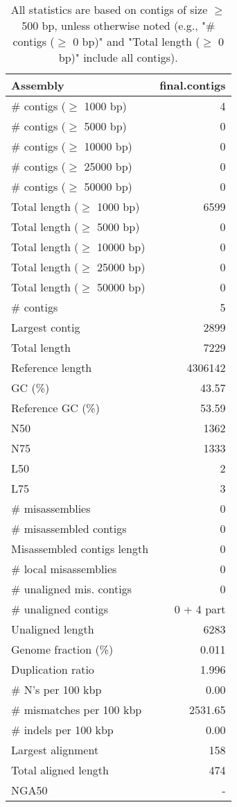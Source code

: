 \documentclass[12pt,a4paper]{article}
\begin{document}
\begin{table}[ht]
\begin{center}
\caption{All statistics are based on contigs of size $\geq$ 500 bp, unless otherwise noted (e.g., "\# contigs ($\geq$ 0 bp)" and "Total length ($\geq$ 0 bp)" include all contigs).}
\begin{tabular}{|l*{1}{|r}|}
\hline
Assembly & final.contigs \\ \hline
\# contigs ($\geq$ 1000 bp) & 4 \\ \hline
\# contigs ($\geq$ 5000 bp) & 0 \\ \hline
\# contigs ($\geq$ 10000 bp) & 0 \\ \hline
\# contigs ($\geq$ 25000 bp) & 0 \\ \hline
\# contigs ($\geq$ 50000 bp) & 0 \\ \hline
Total length ($\geq$ 1000 bp) & 6599 \\ \hline
Total length ($\geq$ 5000 bp) & 0 \\ \hline
Total length ($\geq$ 10000 bp) & 0 \\ \hline
Total length ($\geq$ 25000 bp) & 0 \\ \hline
Total length ($\geq$ 50000 bp) & 0 \\ \hline
\# contigs & 5 \\ \hline
Largest contig & 2899 \\ \hline
Total length & 7229 \\ \hline
Reference length & 4306142 \\ \hline
GC (\%) & 43.57 \\ \hline
Reference GC (\%) & 53.59 \\ \hline
N50 & 1362 \\ \hline
N75 & 1333 \\ \hline
L50 & 2 \\ \hline
L75 & 3 \\ \hline
\# misassemblies & 0 \\ \hline
\# misassembled contigs & 0 \\ \hline
Misassembled contigs length & 0 \\ \hline
\# local misassemblies & 0 \\ \hline
\# unaligned mis. contigs & 0 \\ \hline
\# unaligned contigs & 0 + 4 part \\ \hline
Unaligned length & 6283 \\ \hline
Genome fraction (\%) & 0.011 \\ \hline
Duplication ratio & 1.996 \\ \hline
\# N's per 100 kbp & 0.00 \\ \hline
\# mismatches per 100 kbp & 2531.65 \\ \hline
\# indels per 100 kbp & 0.00 \\ \hline
Largest alignment & 158 \\ \hline
Total aligned length & 474 \\ \hline
NGA50 & - \\ \hline
\end{tabular}
\end{center}
\end{table}
\end{document}
